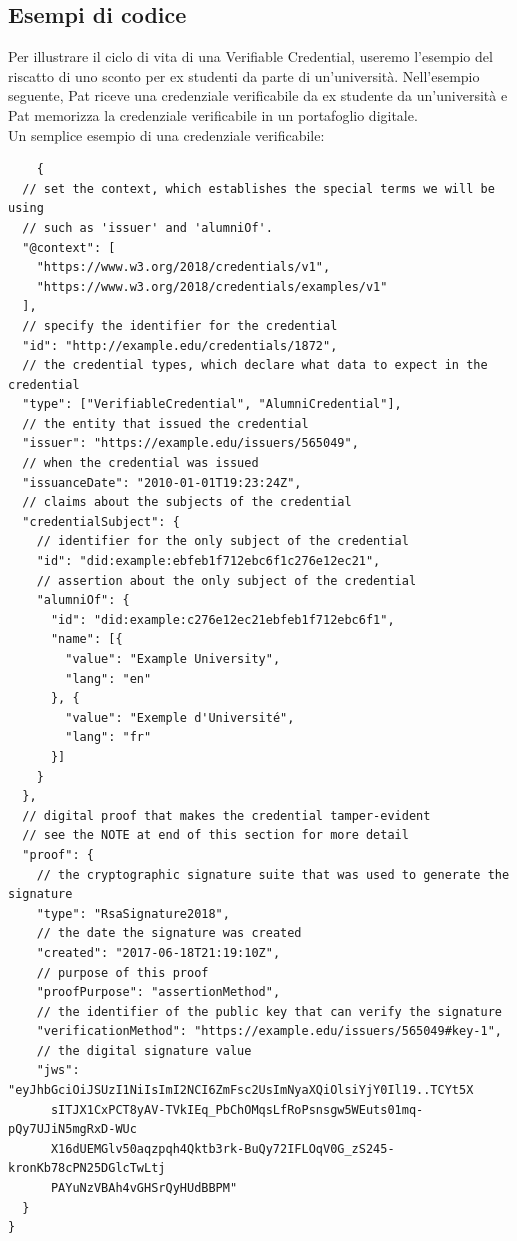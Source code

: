 \subsection{Esempi di codice}
Per illustrare il ciclo di vita di una Verifiable Credential, useremo l'esempio del riscatto di uno sconto per ex studenti da parte di un'università. Nell'esempio seguente, Pat riceve una credenziale verificabile da ex studente da un'università e Pat memorizza la credenziale verificabile in un portafoglio digitale.\\

Un semplice esempio di una credenziale verificabile:
\begin{verbatim}
    {
  // set the context, which establishes the special terms we will be using
  // such as 'issuer' and 'alumniOf'.
  "@context": [
    "https://www.w3.org/2018/credentials/v1",
    "https://www.w3.org/2018/credentials/examples/v1"
  ],
  // specify the identifier for the credential
  "id": "http://example.edu/credentials/1872",
  // the credential types, which declare what data to expect in the credential
  "type": ["VerifiableCredential", "AlumniCredential"],
  // the entity that issued the credential
  "issuer": "https://example.edu/issuers/565049",
  // when the credential was issued
  "issuanceDate": "2010-01-01T19:23:24Z",
  // claims about the subjects of the credential
  "credentialSubject": {
    // identifier for the only subject of the credential
    "id": "did:example:ebfeb1f712ebc6f1c276e12ec21",
    // assertion about the only subject of the credential
    "alumniOf": {
      "id": "did:example:c276e12ec21ebfeb1f712ebc6f1",
      "name": [{
        "value": "Example University",
        "lang": "en"
      }, {
        "value": "Exemple d'Université",
        "lang": "fr"
      }]
    }
  },
  // digital proof that makes the credential tamper-evident
  // see the NOTE at end of this section for more detail
  "proof": {
    // the cryptographic signature suite that was used to generate the signature
    "type": "RsaSignature2018",
    // the date the signature was created
    "created": "2017-06-18T21:19:10Z",
    // purpose of this proof
    "proofPurpose": "assertionMethod",
    // the identifier of the public key that can verify the signature
    "verificationMethod": "https://example.edu/issuers/565049#key-1",
    // the digital signature value
    "jws": "eyJhbGciOiJSUzI1NiIsImI2NCI6ZmFsc2UsImNyaXQiOlsiYjY0Il19..TCYt5X
      sITJX1CxPCT8yAV-TVkIEq_PbChOMqsLfRoPsnsgw5WEuts01mq-pQy7UJiN5mgRxD-WUc
      X16dUEMGlv50aqzpqh4Qktb3rk-BuQy72IFLOqV0G_zS245-kronKb78cPN25DGlcTwLtj
      PAYuNzVBAh4vGHSrQyHUdBBPM"
  }
}
\end{verbatim}
